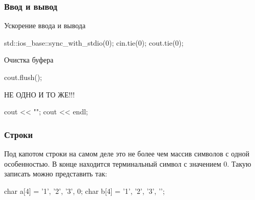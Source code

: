 
\begin{frame}[fragile]
    \frametitle{Ввод и вывод}
    Ускорение ввода и вывода
    \begin{cpp}
            std::ios_base::sync_with_stdio(0);
            cin.tie(0);
            cout.tie(0);
    \end{cpp}

    Очистка буфера
    \begin{cpp}
            cout.flush();
    \end{cpp}

    НЕ ОДНО И ТО ЖЕ!!!
    \begin{cpp}
            cout << "\n";
            cout << endl;
    \end{cpp}
    
\end{frame}


\begin{frame}[fragile]
    \frametitle{Строки}
    
    \quad Под капотом строки на самом деле это не более чем массив символов с одной особенностью. В конце находится терминальный символ с значением 0. Такую записать можно представить так:
    \begin{cpp}
        char a[4] = {'1', '2', '3', 0};
        char b[4] = {'1', '2', '3', '\0'};
    \end{cpp}
\end{frame}

